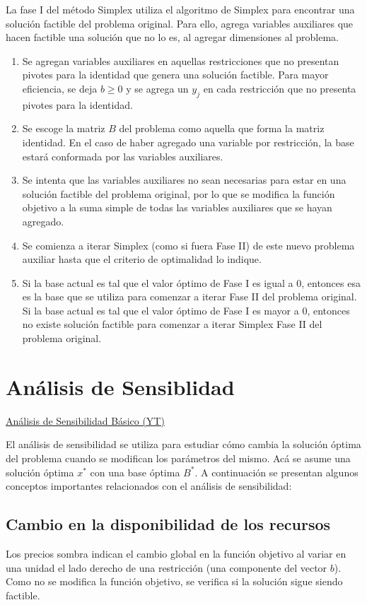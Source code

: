 \documentclass{article}
\begin{document}
La fase I del método Simplex utiliza el algoritmo de Simplex para encontrar una solución factible del problema original. Para ello, agrega variables auxiliares que hacen factible una solución que no lo es, al agregar dimensiones al problema.

\begin{enumerate}
    \item Se agregan variables auxiliares en aquellas restricciones que no presentan pivotes para la identidad que genera una solución factible. Para mayor eficiencia, se deja $b\geq 0$ y se agrega un $y_j$ en cada restricción que no presenta pivotes para la identidad.
    \item Se escoge la matriz $B$ del problema como aquella que forma la matriz identidad. En el caso de haber agregado una variable por restricción, la base estará conformada por las variables auxiliares.
    \item Se intenta que las variables auxiliares no sean necesarias para estar en una solución factible del problema original, por lo que se modifica la función objetivo a la suma simple de todas las variables auxiliares que se hayan agregado.
    \item Se comienza a iterar Simplex (como si fuera Fase II) de este nuevo problema auxiliar hasta que el criterio de optimalidad lo indique.
    \item Si la base actual es tal que el valor óptimo de Fase I es igual a 0, entonces esa es la base que se utiliza para comenzar a iterar Fase II del problema original. Si la base actual es tal que el valor óptimo de Fase I es mayor a 0, entonces no existe solución factible para comenzar a iterar Simplex Fase II del problema original.
\end{enumerate}

\section{Análisis de Sensiblidad}

\href{https://youtu.be/oAPScEPsNqY?si=pdlRFEm7N_gvkkHP}{Análisis de Sensibilidad Básico (YT)}

El análisis de sensibilidad se utiliza para estudiar cómo cambia la solución óptima del problema cuando se modifican los parámetros del mismo. Acá se asume una solución óptima $x^*$ con una base óptima $B^*$. A continuación se presentan algunos conceptos importantes relacionados con el análisis de sensibilidad:

\subsection{Cambio en la disponibilidad de los recursos}
Los precios sombra indican el cambio global en la función objetivo al variar en una unidad el lado derecho de una restricción (una componente del vector $b$). Como no se modifica la función objetivo, se verifica si la solución sigue siendo factible.
\end{document}
